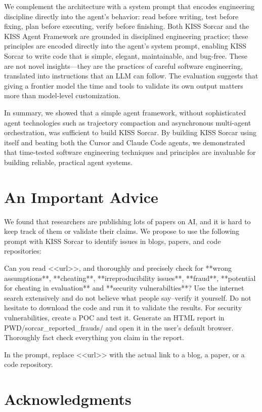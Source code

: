 \documentclass{article}
\begin{document}
We complement the architecture with a system prompt that encodes engineering discipline directly into the agent's behavior: read before writing, test before fixing, plan before executing, verify before finishing.  Both KISS Sorcar and the KISS Agent Framework are grounded in disciplined engineering practice; these principles are encoded directly into the agent's system prompt, enabling KISS Sorcar to write code that is simple, elegant, maintainable, and bug-free.  These are not novel insights---they are the practices of careful software engineering, translated into instructions that an LLM can follow.  The evaluation suggests that giving a frontier model the time and tools to validate its own output matters more than model-level customization.

In summary, we showed that a simple agent framework, without sophisticated agent technologies such as trajectory compaction and asynchronous multi-agent orchestration, was sufficient to build KISS Sorcar.  By building KISS Sorcar using itself and beating both the Cursor and Claude Code agents, we demonstrated that time-tested software engineering techniques and principles are invaluable for building reliable, practical agent systems.

\section*{An Important Advice} We found that researchers are publishing 
lots of papers on AI, and it is hard to keep track of them or validate their claims. We propose to use the following prompt with KISS Sorcar to identify issues in blogs, papers, and code repositories:

\begin{prompt}
Can you read <<url>>, and thoroughly and precisely check for **wrong assumptions**, **cheating**,
**irreproducibility issues**, **fraud**, **potential for cheating in evaluation**
and **security vulnerabilties**?  
Use the internet search extensively and do not believe what people say--verify it yourself.  
Do not hesitate to download the code and run it to validate the results.
For security vulnerabilities, create a POC and test it.  
Generate an HTML report in PWD/sorcar_reported_frauds/ and open it in the user's default browser.
Thoroughly fact check everything you claim in the report.
\end{prompt}
In the prompt, replace <<url>> with the actual link to a blog, a paper, or a code repository.

\section*{Acknowledgments}
\end{document}
